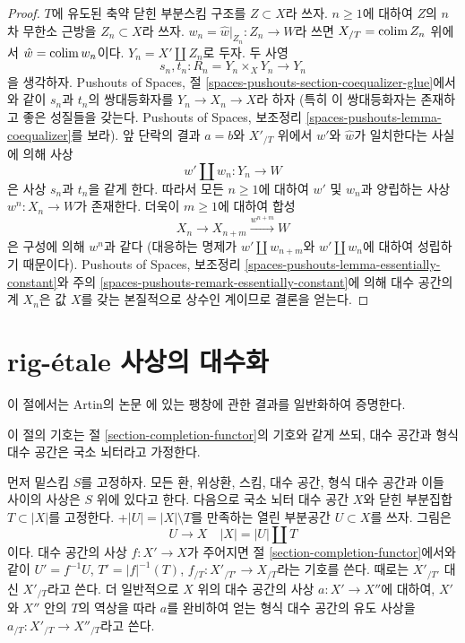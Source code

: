 \begin{proof}
\medskip\noindent
$T$에 유도된 축약 닫힌 부분스킴 구조를 $Z \subset X$라 쓰자.
$n \geq 1$에 대하여 $Z$의 $n$차 무한소 근방을
$Z_n \subset X$라 쓰자. $w_n = \hat w|_{Z_n} : Z_n \to W$라 쓰면
$X_{/T} = \mathop{\mathrm{colim}}\nolimits Z_n$ 위에서 $\hat w = \mathop{\mathrm{colim}}\nolimits w_n$이다.
$Y_n = X' \amalg Z_n$로 두자. 두 사영
$$
s_n, t_n : R_n = Y_n \times_X Y_n \longrightarrow Y_n
$$
을 생각하자. Pushouts of Spaces, 절
\ref{spaces-pushouts-section-coequalizer-glue}에서와 같이
$s_n$과 $t_n$의 쌍대등화자를 $Y_n \to X_n \to X$라 하자
(특히 이 쌍대등화자는 존재하고 좋은 성질들을 갖는다. Pushouts of Spaces,
보조정리 \ref{spaces-pushouts-lemma-coequalizer}를 보라).
앞 단락의 결과 $a = b$와 $X'_{/T}$ 위에서 $w'$와 $\hat w$가
일치한다는 사실에 의해 사상
$$
w' \amalg w_n : Y_n \longrightarrow W
$$
은 사상 $s_n$과 $t_n$을 같게 한다. 따라서 모든 $n \geq 1$에 대하여
$w'$ 및 $w_n$과 양립하는 사상 $w^n : X_n \to W$가 존재한다.
더욱이 $m \geq 1$에 대하여 합성
$$
X_n \to X_{n + m} \xrightarrow{w^{n + m}} W
$$
은 구성에 의해 $w^n$과 같다
(대응하는 명제가 $w' \amalg w_{n + m}$와
$w' \amalg w_n$에 대하여 성립하기 때문이다).
Pushouts of Spaces, 보조정리
\ref{spaces-pushouts-lemma-essentially-constant}와
주의 \ref{spaces-pushouts-remark-essentially-constant}에 의해
대수 공간의 계 $X_n$은 값 $X$를 갖는 본질적으로 상수인 계이므로
결론을 얻는다.
\end{proof}


\section{rig-\'etale 사상의 대수화}
\label{section-algebraization}

\noindent
이 절에서는 Artin의 논문 \cite{ArtinII}에 있는 팽창에 관한 결과를
일반화하여 증명한다.

\medskip\noindent
이 절의 기호는 절 \ref{section-completion-functor}의 기호와 같게 쓰되,
대수 공간과 형식 대수 공간은 국소 뇌터라고 가정한다.

\medskip\noindent
먼저 밑스킴 $S$를 고정하자. 모든 환, 위상환, 스킴, 대수 공간,
형식 대수 공간과 이들 사이의 사상은 $S$ 위에 있다고 한다.
다음으로 국소 뇌터 대수 공간 $X$와 닫힌 부분집합
$T \subset |X|$를 고정한다.
+$|U| = |X| \setminus T$를 만족하는 열린 부분공간 $U \subset X$를 쓰자.
그림은
$$
U \to X \quad |X| = |U| \amalg T
$$
이다. 대수 공간의 사상 $f : X' \to X$가 주어지면 절
\ref{section-completion-functor}에서와 같이
$U' = f^{-1}U$, $T' = |f|^{-1}(T)$,
$f_{/T} : X'_{/T'} \to X_{/T}$라는 기호를 쓴다.
때로는 $X'_{/T'}$ 대신 $X'_{/T}$라고 쓴다. 더 일반적으로
$X$ 위의 대수 공간의 사상 $a : X' \to X''$에 대하여,
$X'$와 $X''$ 안의 $T$의 역상을 따라 $a$를 완비하여 얻는
형식 대수 공간의 유도 사상을
$a_{/T} : X'_{/T} \to X''_{/T}$라고 쓴다.

